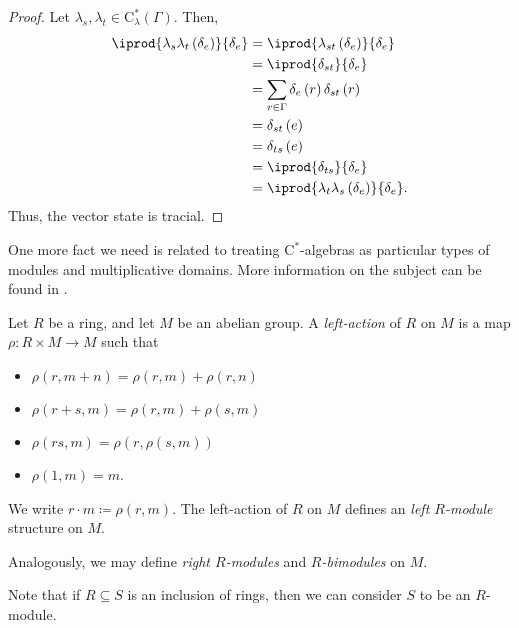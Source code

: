 \begin{proof}
  Let $\lambda_s,\lambda_t\in \mathrm{C}^{\ast}_{\lambda}\left( \Gamma \right)$. Then,
  \begin{align*}
    \iprod{\lambda_s\lambda_t\left( \delta_e \right)}{\delta_e} &= \iprod{\lambda_{st}\left( \delta_e \right)}{\delta_e}\\
                                                                &= \iprod{\delta_{st}}{\delta_e}\\
                                                                &= \sum_{r\in\Gamma}\delta_e\left( r \right)\delta_{st}\left( r \right)\\
                                                                &= \delta_{st}\left( e \right)\\
                                                                &= \delta_{ts}\left( e \right)\\
                                                                &= \iprod{\delta_{ts}}{\delta_e}\\
                                                                &= \iprod{\lambda_t\lambda_s\left( \delta_e \right)}{\delta_e}.
  \end{align*}
  Thus, the vector state is tracial.
\end{proof}
One more fact we need is related to treating $\mathrm{C}^{\ast}$-algebras as particular types of modules and multiplicative domains. More information on the subject can be found in \cite[Chapter 3]{completely_bounded_maps_and_operator_algebras}.
\begin{definition}
  Let $R$ be a ring, and let $M$ be an abelian group. A \textit{left-action} of $R$ on $M$ is a map $\rho\colon R\times M \rightarrow M$ such that
  \begin{itemize}
    \item $\rho\left( r,m+n \right) = \rho\left( r,m \right) + \rho\left( r,n \right)$
    \item $\rho\left( r + s,m \right) = \rho\left( r,m \right) + \rho\left( s,m \right)$
    \item $\rho\left( rs,m \right) = \rho\left( r,\rho\left( s,m \right) \right)$
    \item $\rho\left( 1,m \right) = m$.
  \end{itemize}
  We write $r\cdot m \coloneq \rho\left( r,m \right)$. The left-action of $R$ on $M$ defines an \textit{left $R$-module} structure on $M$.\newline

  Analogously, we may define \textit{right $R$-modules} and \textit{$R$-bimodules} on $M$.
\end{definition}
Note that if $R\subseteq S$ is an inclusion of rings, then we can consider $S$ to be an $R$-module.\newline

